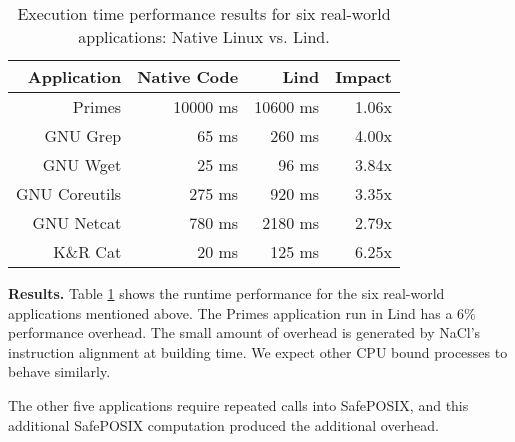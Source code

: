 {{{\begin{table}
\centering
\scriptsize
\begin{tabular}{|r|r|r|r|}
  \hline
  {\bf Application} & {\bf Native Code} & {\bf Lind} & {\bf Impact}  \\
  \hline
  Primes & 10000 ms & 10600 ms & 1.06x \\
  GNU Grep & 65 ms & 260 ms & 4.00x \\
  GNU Wget & 25 ms & 96 ms & 3.84x \\
  GNU Coreutils & 275 ms & 920 ms & 3.35x \\
  GNU Netcat & 780 ms & 2180 ms & 2.79x \\
  K\&R Cat & 20 ms & 125 ms & 6.25x \\
  \hline
\end{tabular}
\caption{\small Execution time performance results for six real-world applications: Native
Linux vs. Lind.}
\label{table:performance_apps}
\end{table}

\noindent
\textbf{Results.}
Table \ref{table:performance_apps} shows the runtime performance
for the six real-world applications mentioned above.
The Primes application run in Lind has a 6\% performance overhead. 
The small amount of overhead is generated by NaCl's instruction alignment at building time. 
We expect other CPU bound processes to behave similarly.

The other five applications 
require repeated calls into SafePOSIX, and this additional SafePOSIX
computation produced the additional overhead.

}}}
